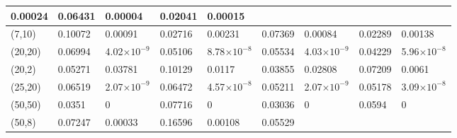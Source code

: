 \documentclass[10pt,twosided]{article}
\numberwithin{equation}{section}
\numberwithin{equation}{section}
\begin{document}
\begin{table}
\begin{tabular}{|p{41pt}|p{32pt}|p{38pt}|p{32pt}|p{38pt}|p{32pt}|p{38pt}|p{32pt}|p{38pt}|}
{0.00024
} & \parbox{32pt}{\raggedright
0.06431
} & \parbox{38pt}{\raggedright
0.00004
} & \parbox{32pt}{\raggedright
0.02041
} & \parbox{38pt}{\raggedright
0.00015
} \\
\hline
\parbox{41pt}{\raggedright
(7,10)
} & \parbox{32pt}{\raggedright
0.10072
} & \parbox{38pt}{\raggedright
0.00091
} & \parbox{32pt}{\raggedright
0.02716
} & \parbox{38pt}{\raggedright
0.00231
} & \parbox{32pt}{\raggedright
0.07369
} & \parbox{38pt}{\raggedright
0.00084
} & \parbox{32pt}{\raggedright
0.02289
} & \parbox{38pt}{\raggedright
0.00138
} \\
\hline
\parbox{41pt}{\raggedright
(20,20)
} & \parbox{32pt}{\raggedright
0.06994
} & \parbox{38pt}{\raggedright
\small{4.02$\times10^{-9}$}
} & \parbox{32pt}{\raggedright
0.05106
} & \parbox{38pt}{\raggedright
\small{8.78$\times10^{-8}$}
} & \parbox{32pt}{\raggedright
0.05534
} & \parbox{38pt}{\raggedright
\small{4.03$\times10^{-9}$}
} & \parbox{32pt}{\raggedright
0.04229
} & \parbox{38pt}{\raggedright
\small{5.96$\times10^{-8}$}
} \\
\hline
\parbox{41pt}{\raggedright
(20,2)
} & \parbox{32pt}{\raggedright
0.05271
} & \parbox{38pt}{\raggedright
0.03781
} & \parbox{32pt}{\raggedright
0.10129
} & \parbox{38pt}{\raggedright
0.0117
} & \parbox{32pt}{\raggedright
0.03855
} & \parbox{38pt}{\raggedright
0.02808
} & \parbox{32pt}{\raggedright
0.07209
} & \parbox{38pt}{\raggedright
0.0061
} \\
\hline
\parbox{41pt}{\raggedright
(25,20)
} & \parbox{32pt}{\raggedright
0.06519
} & \parbox{38pt}{\raggedright
\small{2.07$\times10^{-9}$}
} & \parbox{32pt}{\raggedright
0.06472
} & \parbox{38pt}{\raggedright
\small{4.57$\times10^{-8}$}
} & \parbox{32pt}{\raggedright
0.05211
} & \parbox{38pt}{\raggedright
\small{2.07$\times10^{-9}$}
} & \parbox{32pt}{\raggedright
0.05178
} & \parbox{38pt}{\raggedright
\small{3.09$\times10^{-8}$}
} \\
\hline
\parbox{41pt}{\raggedright
(50,50)
} & \parbox{32pt}{\raggedright
0.0351
} & \parbox{38pt}{\raggedright
0
} & \parbox{32pt}{\raggedright
0.07716
} & \parbox{38pt}{\raggedright
0
} & \parbox{32pt}{\raggedright
0.03036
} & \parbox{38pt}{\raggedright
0
} & \parbox{32pt}{\raggedright
0.0594
} & \parbox{38pt}{\raggedright
0
} \\
\hline
\parbox{41pt}{\raggedright
(50,8)
} & \parbox{32pt}{\raggedright
0.07247
} & \parbox{38pt}{\raggedright
0.00033
} & \parbox{32pt}{\raggedright
0.16596
} & \parbox{38pt}{\raggedright
0.00108
} & \parbox{32pt}{\raggedright
0.05529
} & \parbox{38pt}{\raggedright
}
\end{tabular}
\end{table}
\end{document}
